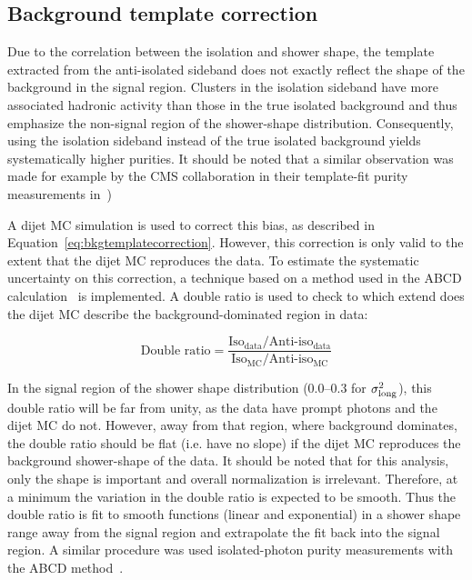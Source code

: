 \subsection{Background template correction}
\label{sec:bkgtemplatecorrection}
Due to the correlation between the isolation and shower shape, the template extracted from the anti-isolated sideband does not exactly reflect the shape of the background in the signal region. Clusters in the isolation sideband have more associated hadronic activity than those in the true isolated background and thus emphasize the non-signal region of the shower-shape distribution. Consequently, using the isolation sideband instead of the true isolated background yields systematically higher purities. It should be noted that a similar observation was made for example by the CMS collaboration in their template-fit purity measurements in~\cite{Sirunyan:2017qhf})

A dijet MC simulation is used to correct this bias, as described in Equation~\ref{eq:bkgtemplatecorrection}. However, this correction is only valid to the extent that the dijet MC reproduces the data. To estimate the systematic uncertainty on this correction, a technique based on a method used in the ABCD calculation~\cite{Erwann} is implemented. A double ratio is used to check to which extend does the dijet MC describe the background-dominated region in data: 

\begin{equation}
    \text{Double ratio} = \frac{\text{Iso}_{\text{data}}/\text{Anti-iso}_{\text{data}}}{\text{Iso}_{\text{MC}}/\text{Anti-iso}_{\text{MC}}}
    \label{eq:bkgtemplatedoubleratio}
\end{equation}

In the signal region of the shower shape distribution (0.0--0.3 for $\sigma^{2}_{\mathrm{long}}$), this double ratio will be far from unity, as the data have prompt photons and the dijet MC do not. However, away from that region, where background dominates, the double ratio should be flat (i.e. have no slope) if the dijet MC reproduces the background shower-shape of the data. It should be noted that for this analysis, only the shape is important and overall normalization is irrelevant. Therefore, at a minimum the variation in the double ratio is expected to be smooth. Thus the double ratio is fit to smooth functions (linear and exponential) in a shower shape range away from the signal region and extrapolate the fit back into the signal region. A similar procedure was used isolated-photon purity measurements with the ABCD method~\cite{Acharya:2019jkx}.

